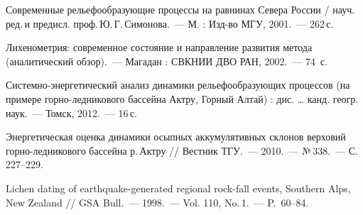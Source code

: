 \begin{thebibliography}{99}
  \bibitem{}
	 Современные рельефообразующие процессы на равнинах
	Севера России / науч.\,ред.\,и предисл. проф.\,Ю.\,Г.\,Симонова.~--- М. : Изд-во
	МГУ, 2001.~--- 262\,с.

  \bibitem{}
	 Лихенометрия: современное состояние и направление развития
метода (аналитический обзор).~--- Магадан : СВКНИИ ДВО РАН, 2002.~--- 74~с.

  \bibitem{}
	 Системно-энергетический анализ динамики рельефообразующих
процессов (на примере горно-ледникового бассейна Актру, Горный Алтай) : дис. …
канд. геогр. наук.~--- Томск, 2012.~--- 16\,с.

  \bibitem{}
	 Энергетическая оценка динамики осыпных
аккумулятивных склонов верховий горно-ледникового бассейна р.\,Актру // Вестник
ТГУ.~--- 2010.~--- №\,338.~--- С.\,227--229.

  \bibitem{}
	 Lichen dating of earthquake-generated regional
rock-fall events, Southern Alps, New Zealand // GSA Bull.~--- 1998.~--- Vol.
110, No.\,1.~--- P.~60--84.
\end{thebibliography}
\thispagestyle{empty}
